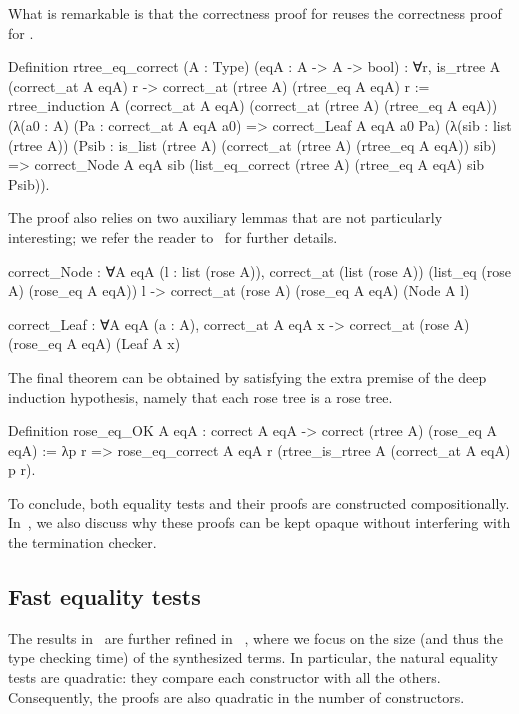 \documentclass[a4paper, 11pt]{book}
\begin{document}
What is remarkable is that the correctness proof for 
reuses the correctness proof for .

\begin{rocqcode}
Definition rtree_eq_correct (A : Type) (eqA : A -> A -> bool) :
  ∀r, is_rtree A (correct_at A eqA) r ->
        correct_at (rtree A) (rtree_eq A eqA) r
:=
  rtree_induction
    A (correct_at A eqA) (correct_at (rtree A) (rtree_eq A eqA))
    (λ(a0 : A) (Pa : correct_at A eqA a0) =>
       correct_Leaf A eqA a0 Pa)
    (λ(sib : list (rtree A))
         (Psib : is_list (rtree A)
                   (correct_at (rtree A) (rtree_eq A eqA)) sib) =>
       correct_Node A eqA sib
         (list_eq_correct (rtree A) (rtree_eq A eqA) sib Psib)).
\end{rocqcode}

The proof also relies on two auxiliary lemmas that are not particularly
interesting; we refer the reader to~\cite{tassi:hal-01897468} for further
details.

\begin{rocqcode}
correct_Node : ∀A eqA (l : list (rose A)),
  correct_at (list (rose A)) (list_eq (rose A) (rose_eq A eqA)) l ->
    correct_at (rose A) (rose_eq A eqA) (Node A l)

correct_Leaf : ∀A eqA (a : A),
  correct_at A eqA x ->
    correct_at (rose A) (rose_eq A eqA) (Leaf A x)
\end{rocqcode}

The final theorem can be obtained by satisfying the extra premise of the deep
induction hypothesis, namely that each rose tree is a rose tree.

\begin{rocqcode}
Definition rose_eq_OK A eqA :
  correct A eqA -> correct (rtree A) (rose_eq A eqA)
:=
  λp r =>
    rose_eq_correct A eqA
      r (rtree_is_rtree A (correct_at A eqA) p r).
\end{rocqcode}


To conclude, both equality tests and their proofs are constructed
compositionally. In~\cite{tassi:hal-01897468}, we also discuss why these proofs
can be kept opaque without interfering with the termination checker.

\subsection{Fast equality tests}

The results in~\cite{tassi:hal-01897468} are further refined in
~\cite{gregoire:hal-03800154}, where we focus on the size (and thus the type
checking time) of the synthesized terms. In particular, the natural equality
tests are quadratic: they compare each constructor with all the others.
Consequently, the proofs are also quadratic in the number of constructors.
\end{document}
